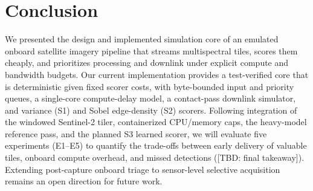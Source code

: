 \documentclass[conference]{IEEEtran}
\begin{document}
\section{Conclusion}

We presented the design and implemented simulation core of an emulated onboard satellite imagery pipeline that streams multispectral tiles, scores them cheaply, and prioritizes processing and downlink under explicit compute and bandwidth budgets. Our current implementation provides a test-verified core that is deterministic given fixed scorer costs, with byte-bounded input and priority queues, a single-core compute-delay model, a contact-pass downlink simulator, and variance (S1) and Sobel edge-density (S2) scorers. Following integration of the windowed Sentinel-2 tiler, containerized CPU/memory caps, the heavy-model reference pass, and the planned S3 learned scorer, we will evaluate five experiments (E1--E5) to quantify the trade-offs between early delivery of valuable tiles, onboard compute overhead, and missed detections ([TBD: final takeaway]). Extending post-capture onboard triage to sensor-level selective acquisition remains an open direction for future work.



\end{document}
